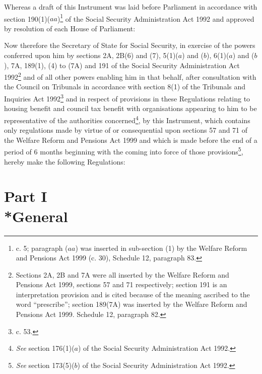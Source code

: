 \documentclass[12pt,a4paper]{article}
\title{\regstitle}
\author{S.I. 2000 No. 897}
\date{Made
28th March 2000\\
Coming into force
3rd April 2000}
\begin{document}
\maketitle

\noindent
Whereas a draft of this Instrument was laid before Parliament in accordance with section 190(1)($aa$)\footnote{ c. 5; paragraph ($aa$) was inserted in sub-section (1) by the Welfare Reform and Pensions Act 1999 (c. 30), Schedule 12, paragraph 83.} of the Social Security Administration Act 1992 and approved by resolution of each House of Parliament:

Now therefore the Secretary of State for Social Security, in exercise of the powers conferred upon him by sections 2A, 2B(6) and (7), 5(1)($a$)  and ($b$), 6(1)($a$)  and ($b$), 7A, 189(1), (4) to (7A) and 191 of the Social Security Administration Act 1992\footnote{\frenchspacing Sections 2A, 2B and 7A were all inserted by the Welfare Reform and Pensions Act 1999, sections 57 and 71 respectively; section 191 is an interpretation provision and is cited because of the meaning ascribed to the word “prescribe”; section 189(7A) was inserted by the Welfare Reform and Pensions Act 1999. Schedule 12, paragraph 82.} and of all other powers enabling him in that behalf, after consultation with the Council on Tribunals in accordance with section 8(1) of the Tribunals and Inquiries Act 1992\footnote{ c. 53.} and in respect of provisions in these Regulations relating to housing benefit and council tax benefit with organisations appearing to him to be representative of the authorities concerned\footnote{\frenchspacing \emph{See} section 176(1)($a$) of the Social Security Administration Act 1992.}, by this Instrument, which contains only regulations made by virtue of or consequential upon sections 57 and 71 of the Welfare Reform and Pensions Act 1999 and which is made before the end of a period of 6 months beginning with the coming into force of those provisions\footnote{\frenchspacing \emph{See} section 173(5)($b$) of the Social Security Administration Act 1992.}, hereby make the following Regulations: 

{\sloppy

\tableofcontents

}

\bigskip

\setcounter{secnumdepth}{-2}

\section[Part I — General]{Part I\\*General}
\end{document}
